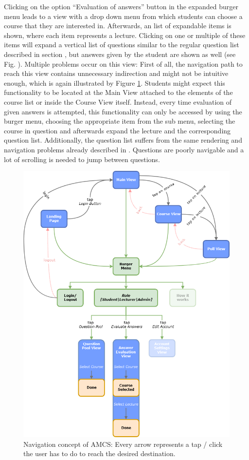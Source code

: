 Clicking on the option “Evaluation of answers” button in the expanded burger menu leads to a view with a drop down menu from which students can choose a course that they are interested in. Afterwards, an list of expandable items is shown, where each item represents a lecture. Clicking on one or multiple of these items will expand a vertical list of questions similar to  the regular question list described in section \todosct, but answers given by the student are shown as well (see Fig. \todosct).
Multiple problems occur on this view: First of all, the navigation path to reach this view contains unnecessary indirection and might not be intuitive enough, which is again illustrated by Figure \ref{figure:clickpathproblems}. Students might expect this functionality to be located at the Main View attached to the elements of the course list or inside the Course View itself. Instead, every time evaluation of given answers is attempted, this functionality can only be accessed by using the burger menu, choosing the appropriate item from the sub menu, selecting the course in question and afterwards expand the lecture and the corresponding question list.
Additionally, the question list suffers from the same rendering and navigation problems already described in \todosct. Questions are poorly navigable and a lot of scrolling is needed to jump between questions.



\begin{figure}[ht]
	\centering
	\includegraphics[width=\textwidth]{diagrams/amcs-click-paths.png}
	\caption{Navigation concept of AMCS: Every arrow represents a tap / click the user has to do to reach the desired destination.}
	\label{figure:clickpathproblems}
\end{figure}
